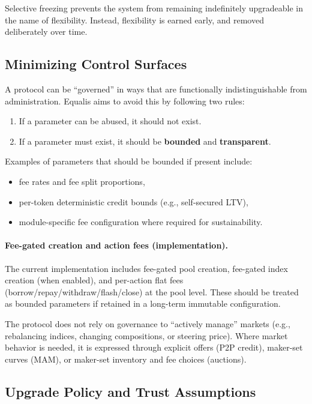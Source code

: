 \documentclass[version=preprint]{iacrcc}
\begin{document}
Selective freezing prevents the system from remaining indefinitely upgradeable in the name of flexibility. Instead, flexibility is earned early, and removed deliberately over time.

\subsection{Minimizing Control Surfaces}

A protocol can be ``governed'' in ways that are functionally indistinguishable from administration. Equalis aims to avoid this by following two rules:
\begin{enumerate}
  \item If a parameter can be abused, it should not exist.
  \item If a parameter must exist, it should be \textbf{bounded} and \textbf{transparent}.
\end{enumerate}

Examples of parameters that should be bounded if present include:
\begin{itemize}
  \item fee rates and fee split proportions,
  \item per-token deterministic credit bounds (e.g., self-secured LTV),
  \item module-specific fee configuration where required for sustainability.
\end{itemize}

\paragraph{Fee-gated creation and action fees (implementation).}
The current implementation includes fee-gated pool creation, fee-gated index creation (when enabled), and per-action flat fees (borrow/repay/withdraw/flash/close) at the pool level. These should be treated as bounded parameters if retained in a long-term immutable configuration.

The protocol does not rely on governance to ``actively manage'' markets (e.g., rebalancing indices, changing compositions, or steering price). Where market behavior is needed, it is expressed through explicit offers (P2P credit), maker-set curves (MAM), or maker-set inventory and fee choices (auctions).

\subsection{Upgrade Policy and Trust Assumptions}
\end{document}
